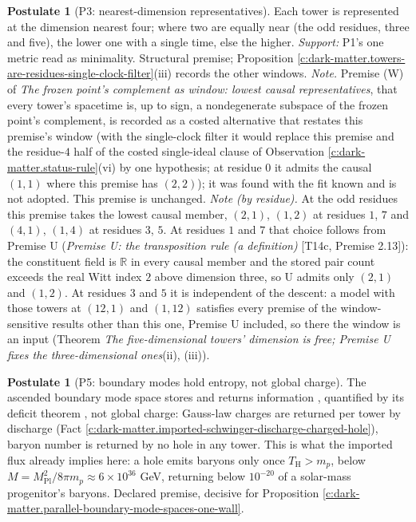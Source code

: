 \documentclass[11pt]{article}
\theoremstyle{definition}
\newtheorem{postulate}[theorem]{Postulate}
\theoremstyle{plain}
\newcommand{\changedmark}[2]{\marginpar{\raggedright\scriptsize\color{#1}#2}}
\providecommand{\R}{}\renewcommand{\R}{\mathbb{R}}
\begin{document}
\begin{postulate}[P3: nearest-dimension representatives]\label{c:dark-matter.p3-nearest-dimension-representatives}
\changedmark{BurntOrange}{changed since the deposit}
Each tower is represented at the dimension nearest four; where two are equally near (the odd residues, three and five), the lower one with a single time, else the higher. \emph{Support:} P1's one metric read as minimality. Structural premise; Proposition \ref{c:dark-matter.towers-are-residues-single-clock-filter}(iii) records the other windows. \emph{Note.} Premise (W) of \emph{The frozen point's complement as window: lowest causal representatives}, that every tower's spacetime is, up to sign, a nondegenerate subspace of the frozen point's complement, is recorded as a costed alternative that restates this premise's window (with the single-clock filter it would replace this premise and the residue-$4$ half of the costed single-ideal clause of Observation \ref{c:dark-matter.status-rule}(vi) by one hypothesis; at residue $0$ it admits the causal $(1,1)$ where this premise has $(2,2)$); it was found with the fit known and is not adopted. This premise is unchanged. \emph{Note (by residue).} At the odd residues this premise takes the lowest causal member, $(2,1)$, $(1,2)$ at residues $1$, $7$ and $(4,1)$, $(1,4)$ at residues $3$, $5$. At residues $1$ and $7$ that choice follows from Premise U (\emph{Premise U: the transposition rule (a definition)} [T14c, Premise 2.13]): the constituent field is $\R$ in every causal member and the stored pair count exceeds the real Witt index $2$ above dimension three, so U admits only $(2,1)$ and $(1,2)$. At residues $3$ and $5$ it is independent of the descent: a model with those towers at $(12,1)$ and $(1,12)$ satisfies every premise of the window-sensitive results other than this one, Premise U included, so there the window is an input (Theorem \emph{The five-dimensional towers' dimension is free; Premise U fixes the three-dimensional ones}(ii), (iii)).
\end{postulate}

\begin{postulate}[P5: boundary modes hold entropy, not global charge]\label{c:dark-matter.p5-boundary-modes-hold-entropy-not}
The ascended boundary mode space stores and returns information \cite[Thm.~11.5, Cor.~11.7]{ButlerT5}, quantified by its deficit theorem \cite[Thm.~9.3]{ButlerT5}, not global charge: Gauss-law charges are returned per tower by discharge (Fact \ref{c:dark-matter.imported-schwinger-discharge-charged-hole}), baryon number is returned by no hole in any tower. This is what the imported flux \cite[Assembly~5.4]{ButlerT7} already implies here: a hole emits baryons only once $T_{\mathrm{H}} > m_{p}$, below $M = M_{\mathrm{Pl}}^{2}/8\pi m_{p} \approx 6 \times 10^{36}$ GeV, returning below $10^{-20}$ of a solar-mass progenitor's baryons. Declared premise, decisive for Proposition \ref{c:dark-matter.parallel-boundary-mode-spaces-one-wall}.
\end{postulate}
\end{document}
